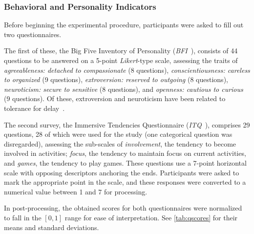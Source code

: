 \documentclass[10pt,letterpaper]{article}
\begin{document}
\subsubsection{Behavioral and Personality Indicators}

Before beginning the experimental procedure, participants were asked to fill out two questionnaires.

The first of these, the Big Five Inventory of Personality (\emph{BFI}~\autocite{john1999:bfi}), consists of 44 questions to be answered on a 5-point \emph{Likert}-type scale, assessing the traits of \emph{agreeableness: detached to compassionate} (8 questions), \emph{conscientiousness: careless to organized} (9 questions), \emph{extroversion: reserved to outgoing} (8 questions), \emph{neuroticism: secure to sensitive} (8 questions), and \emph{openness: cautious to curious} (9 questions).
Of these, extroversion and neuroticism have been related to tolerance for delay~\autocite{hirsh2008delay}. 

The second survey, the Immersive Tendencies Questionnaire (\emph{ITQ}~\autocite{witmer1998:itq}), comprises 29 questions, 28 of which were used for the study (one categorical question was disregarded), assessing the sub-scales of \emph{involvement}, the tendency to become involved in activities; \emph{focus}, the tendency to maintain focus on current activities, and \emph{games}, the tendency to play games.
These questions use a 7-point horizontal scale  with opposing descriptors anchoring  the ends.
Participants were asked to mark the appropriate point in the scale, and these responses were converted to a numerical value between 1 and 7 for processing. 

In post-processing, the obtained scores for both questionnaires were normalized to fall in the \( [0, 1] \) range for ease of interpretation. 
See \cref{tab:qscores} for their means and standard deviations.
\end{document}
